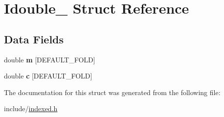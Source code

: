 \hypertarget{struct_idouble__}{}\section{Idouble\+\_\+ Struct Reference}
\label{struct_idouble__}
\subsection*{Data Fields}
\begin{DoxyCompactItemize}
\item 
\hypertarget{struct_idouble___a80f7cecbe93970fa4bd6f1fae0191f57}{}double {\bfseries m} \mbox{[}D\+E\+F\+A\+U\+L\+T\+\_\+\+F\+O\+L\+D\mbox{]}\label{struct_idouble___a80f7cecbe93970fa4bd6f1fae0191f57}

\item 
\hypertarget{struct_idouble___a7871afd4cba16adbcc5cc46d0d55b88f}{}double {\bfseries c} \mbox{[}D\+E\+F\+A\+U\+L\+T\+\_\+\+F\+O\+L\+D\mbox{]}\label{struct_idouble___a7871afd4cba16adbcc5cc46d0d55b88f}

\end{DoxyCompactItemize}


The documentation for this struct was generated from the following file\+:\begin{DoxyCompactItemize}
\item 
include/\hyperlink{indexed_8h}{indexed.\+h}\end{DoxyCompactItemize}
